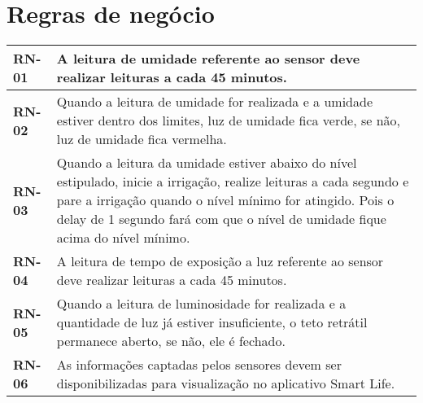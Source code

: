     \section{Regras de negócio}
        \begin{table}[!htbp]
            \centering
            \renewcommand{\arraystretch}{1.3}
            \label{tab:quadro_regras_negocio}
            \begin{tabular}{| L{3cm} | L{11cm} | }
                \hline
                \textbf{RN-01} & A leitura de umidade referente ao sensor deve realizar leituras a cada 45 minutos.\\
                \hline

                \hline
                \textbf{RN-02} & Quando a leitura de umidade for realizada e a umidade estiver dentro dos limites, luz de umidade fica verde, se não, luz de umidade fica vermelha.\\
                \hline                

                \hline
                \textbf{RN-03} & Quando a leitura da umidade estiver abaixo do nível estipulado, inicie a irrigação, realize leituras a cada segundo e pare a irrigação quando o nível mínimo for atingido. Pois o delay de 1 segundo fará com que o nível de umidade fique acima do nível mínimo.\\
                \hline

                \hline
                \textbf{RN-04} & A leitura de tempo de exposição a luz referente ao sensor deve realizar leituras a cada 45 minutos.\\
                \hline

                \hline
                \textbf{RN-05} & Quando a leitura de luminosidade for realizada e a quantidade de luz já estiver
                insuficiente, o teto retrátil permanece aberto, se não, ele é fechado.\\
                \hline

                \hline
                \textbf{RN-06} & As informações captadas pelos sensores devem ser disponibilizadas para visualização
                no aplicativo Smart Life.\\
                \hline

            \end{tabular}
            \vspace{2mm}
        \end{table}

\newpage

